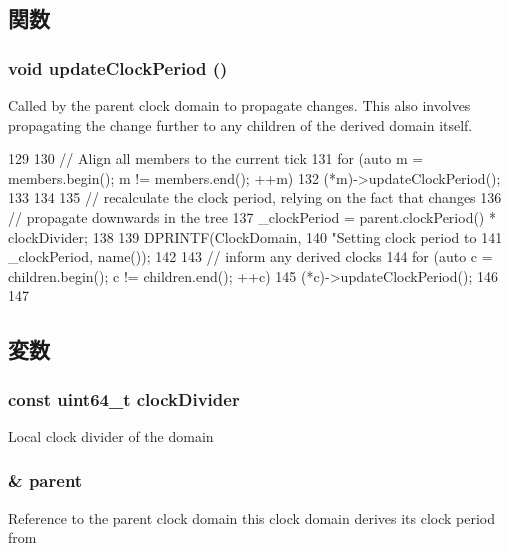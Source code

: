 \subsection{関数}
\hypertarget{classDerivedClockDomain_a0629a73fecc22f407351ee5630e8a2f9}{
\subsubsection[{updateClockPeriod}]{\setlength{\rightskip}{0pt plus 5cm}void updateClockPeriod ()}}
\label{classDerivedClockDomain_a0629a73fecc22f407351ee5630e8a2f9}
Called by the parent clock domain to propagate changes. This also involves propagating the change further to any children of the derived domain itself. 


\begin{DoxyCode}
129 {
130     // Align all members to the current tick
131     for (auto m = members.begin(); m != members.end(); ++m) {
132         (*m)->updateClockPeriod();
133     }
134 
135     // recalculate the clock period, relying on the fact that changes
136     // propagate downwards in the tree
137     _clockPeriod = parent.clockPeriod() * clockDivider;
138 
139     DPRINTF(ClockDomain,
140             "Setting clock period to %
141             _clockPeriod, name());
142 
143     // inform any derived clocks
144     for (auto c = children.begin(); c != children.end(); ++c) {
145         (*c)->updateClockPeriod();
146     }
147 }
\end{DoxyCode}


\subsection{変数}
\hypertarget{classDerivedClockDomain_ae50eb75652dfa3720bbfefdf17308e0f}{
\subsubsection[{clockDivider}]{\setlength{\rightskip}{0pt plus 5cm}const uint64\_\-t {\bf clockDivider}}}
\label{classDerivedClockDomain_ae50eb75652dfa3720bbfefdf17308e0f}
Local clock divider of the domain \hypertarget{classDerivedClockDomain_a95cdc68e9450163b78382463aa16ec33}{
\subsubsection[{parent}]{\& {\bf parent}}}
\label{classDerivedClockDomain_a95cdc68e9450163b78382463aa16ec33}
Reference to the parent clock domain this clock domain derives its clock period from 

